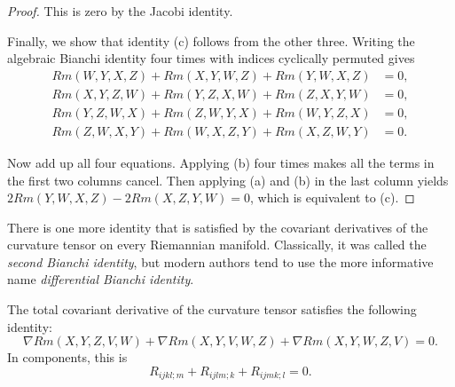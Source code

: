 \begin{proof}
This is zero by the Jacobi identity.

Finally, we show that identity (c) follows from the other three. Writing the algebraic Bianchi identity four times with indices cyclically permuted gives
\begin{align*}
Rm(W, Y, X, Z) + Rm(X, Y, W, Z) + Rm(Y, W, X, Z) &= 0,\\
Rm(X, Y, Z, W) + Rm(Y, Z, X, W) + Rm(Z, X, Y, W) &= 0,\\
Rm(Y, Z, W, X) + Rm(Z, W, Y, X) + Rm(W, Y, Z, X) &= 0,\\
Rm(Z, W, X, Y) + Rm(W, X, Z, Y) + Rm(X, Z, W, Y) &= 0.
\end{align*}

Now add up all four equations. Applying (b) four times makes all the terms in the first two columns cancel. Then applying (a) and (b) in the last column yields $2Rm(Y, W, X, Z) - 2Rm(X, Z, Y, W) = 0$, which is equivalent to (c).
\end{proof}

There is one more identity that is satisfied by the covariant derivatives of the curvature tensor on every Riemannian manifold. Classically, it was called the \textit{second Bianchi identity}, but modern authors tend to use the more informative name \textit{differential Bianchi identity}.

\begin{proposition}
\label{prop:differential-bianchi-identity}
The total covariant derivative of the curvature tensor satisfies the following identity:
\begin{equation}
\nabla Rm(X, Y, Z, V, W) + \nabla Rm(X, Y, V, W, Z) + \nabla Rm(X, Y, W, Z, V) = 0. \tag{7.14}
\end{equation}
In components, this is
\begin{equation}
R_{ijkl;m} + R_{ijlm;k} + R_{ijmk;l} = 0. \tag{7.15}
\end{equation}
\end{proposition}

